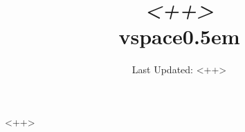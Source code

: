 \documentclass[a4paper]{article}
\title{\textit{<++>}\\vspace{0.5em}\huge <++>}
\date{Last Updated: <++>}
\begin{document}
\maketitle
\begingroup
    \renewcommand*{\IgnoreToc}[1]{}%
    \tableofcontents
\endgroup
\listoffigures
\pagebreak

<++>

\printbibliography
\end{document}

